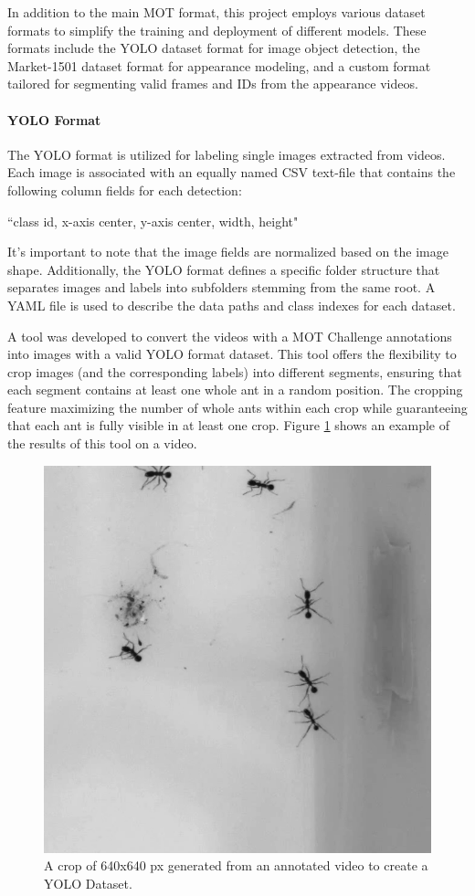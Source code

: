 {
    In addition to the main \ac{MOT} format, this project employs various dataset formats to simplify the training and deployment of different models. 
    These formats include the \ac{YOLO} dataset format\cite{yoloFormat} for image object detection, 
    the Market-1501 dataset format\cite{Market-1501} for appearance modeling, 
    and a custom format tailored for segmenting valid frames and IDs from the appearance videos.
}

\paragraph{YOLO Format}

{
    The \ac{YOLO} format is utilized for labeling single images extracted from videos. 
    Each image is associated with an equally named \ac{CSV} text-file that contains the following column fields for each detection:
}

\begin{center}
    {``class id, x-axis center, y-axis center, width, height"}
\end{center}

{
    It's important to note that the image fields are normalized based on the image shape. 
    Additionally, the \ac{YOLO} format defines a specific folder structure that separates images and labels into subfolders stemming from the same root. 
    A YAML file is used to describe the data paths and class indexes for each dataset.
}

{
    A tool was developed to convert the videos with a MOT Challenge annotations into images with a valid \ac{YOLO} format dataset. 
    This tool offers the flexibility to crop images (and the corresponding labels) into different segments, ensuring that each segment contains at least one whole ant in a random position. 
    The cropping feature maximizing the number of whole ants within each crop while guaranteeing that each ant is fully visible in at least one crop.
    Figure \ref{fig:yolo crop} shows an example of the results of this tool on a video.
}

\begin{figure}[!b]
    \centering
    \includegraphics[width=0.4\linewidth]{figures/05_methodology/yolo_crop.png}
    \caption[YOLO dataset: crop of 640x640 px]{\footnotesize{A crop of 640x640 px generated from an annotated video to create a YOLO Dataset.}}
    \label{fig:yolo crop}
    \vspace{-3em}
\end{figure}

